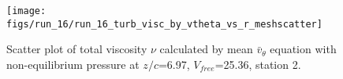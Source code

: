 \begin{figure}[H]
\centering
\texttt{[image: figs/run\_16/run\_16\_turb\_visc\_by\_vtheta\_vs\_r\_meshscatter]}
\caption{Scatter plot of total viscosity $\nu$ calculated by mean $\bar{v}_{\theta}$ equation with non-equilibrium pressure at $z/c$=6.97, $V_{free}$=25.36, station 2.}
\label{fig:run_16_turb_visc_by_vtheta_vs_r_meshscatter}
\end{figure}


